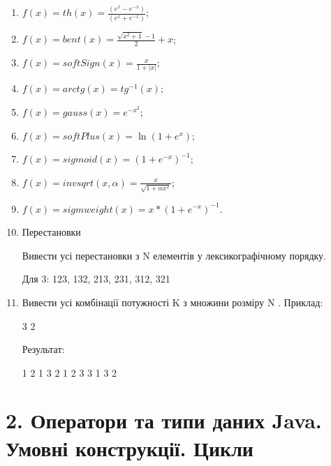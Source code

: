 \documentclass[]{article}
\makeatletter
\newcommand{\xslalph}[1]{\expandafter\@xslalph\csname c@#1\endcsname}
\newcommand{\@xslalph}[1]{%
    \ifcase#1\or а\or б\or в\or г\or д\or e\or є\or ж\or з\or i%
    \or й\or к\or л\or м\or н\or о\or п\or р\or с\or т%
    \or у\or ф\or х\or ц\or ч\or ш\or ю\or я\or аа\or бб\or вв %
    \else\@ctrerr\fi%
}
\makeatother
\begin{document}
\begin{enumerate}
  \begin{enumerate}[label=\xslalph*)]
  \item   \(f(x) = th(x) = \frac{(e^{x} - e^{-x})}{(e^{x} + e^{-x})}\);
\item \(f(x) = bent(x) = \frac{\sqrt{x^{2} + 1} - 1}{2} + x\);
\item \(f(x) = softSign(x) = \frac{x}{1 + |x|}\);
\item \(f(x) = arctg(x) = tg^{-1}(x)\);
\item\(f(x) = gauss(x) = e^{-x^{2}}\);
\item \(f(x) = softPlus(x) = \ln(1 + e^{x})\);
\item \(f(x) = sigmoid(x) = {(1 + e^{-x})}^{-1}\);
\item \(f(x) = invsqrt(x,\alpha) = \frac{x}{\sqrt{1 + \alpha x^{2}}}\);
\item\(f(x) = sigmweight(x) = x*{(1 + e^{-x})}^{-1}\).

\item

Перестановки

Вивести усі перестановки з N елементів у лексикографічному порядку.

Для 3: 123, 132, 213, 231, 312, 321 

\item
Вивести усі комбінації потужності K з множини розміру N .
Приклад:

3 2

Результат:

1 2
1 3
2 1
2 3
3 1
3 2 

 \end{enumerate}



\end{enumerate}


  \section{ 2. Оператори та типи даних Java. Умовні конструкції. Цикли}
\end{document}
